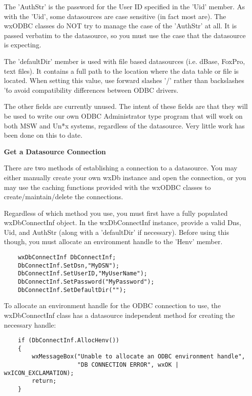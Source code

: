 The 'AuthStr' is the password for the User ID specified in the 'Uid' member.  
As with the 'Uid', some datasources are case sensitive (in fact most are).  
The wxODBC classes do NOT try to manage the case of the 'AuthStr' at all.  
It is passed verbatim to the datasource, so you must use the case that the 
datasource is expecting.

The 'defaultDir' member is used with file based datasources (i.e. dBase, 
FoxPro, text files).  It contains a full path to the location where the 
data table or file is located.  When setting this value, use forward 
slashes '/' rather than backslashes '\' to avoid compatibility differences 
between ODBC drivers.

The other fields are currently unused.  The intent of these fields are that 
they will be used to write our own ODBC Administrator type program that will 
work on both MSW and Un*x systems, regardless of the datasource.  Very little 
work has been done on this to date.


{\bf Get a Datasource Connection}

There are two methods of establishing a connection to a datasource.  You 
may either manually create your own wxDb instance and open the connection, 
or you may use the caching functions provided with the wxODBC classes to 
create/maintain/delete the connections.

Regardless of which method you use, you must first have a fully populated 
wxDbConnectInf object.  In the wxDbConnectInf instance, provide a valid 
Dns, Uid, and AuthStr (along with a 'defaultDir' if necessary).  Before 
using this though, you must allocate an environment handle to the 'Henv' 
member.

\begin{verbatim}
    wxDbConnectInf DbConnectInf;
    DbConnectInf.SetDsn,"MyDSN");
    DbConnectInf.SetUserID,"MyUserName");
    DbConnectInf.SetPassword("MyPassword");
    DbConnectInf.SetDefaultDir("");
\end{verbatim}

To allocate an environment handle for the ODBC connection to use, the 
wxDbConnectInf class has a datasource independent method for creating 
the necessary handle:

\begin{verbatim}
    if (DbConnectInf.AllocHenv())
    {
        wxMessageBox("Unable to allocate an ODBC environment handle",
                     "DB CONNECTION ERROR", wxOK | wxICON_EXCLAMATION);
        return;
    } 
\end{verbatim}


